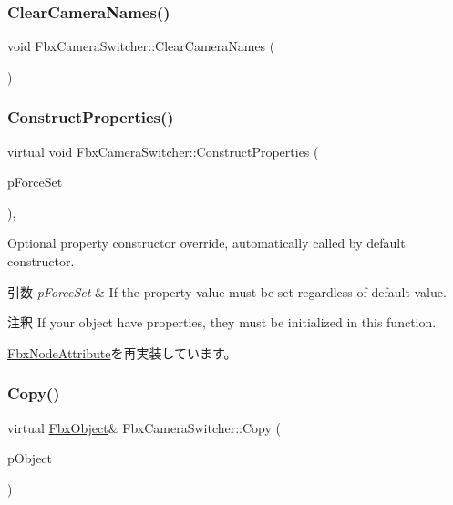 \subsubsection{\texorpdfstring{Clear\+Camera\+Names()}{ClearCameraNames()}}
{\footnotesize\ttfamily void Fbx\+Camera\+Switcher\+::\+Clear\+Camera\+Names (\begin{DoxyParamCaption}{ }\end{DoxyParamCaption})}

\mbox{\label{class_fbx_camera_switcher_a38011053f3a61df4e93989d7c970fa16}} 
\subsubsection{\texorpdfstring{Construct\+Properties()}{ConstructProperties()}}
{\footnotesize\ttfamily virtual void Fbx\+Camera\+Switcher\+::\+Construct\+Properties (\begin{DoxyParamCaption}\item[{bool}]{p\+Force\+Set }\end{DoxyParamCaption})\hspace{0.3cm}{\ttfamily [protected]}, {\ttfamily [virtual]}}

Optional property constructor override, automatically called by default constructor. 
\begin{DoxyParams}{引数}
{\em p\+Force\+Set} & If the property value must be set regardless of default value. \\
\hline
\end{DoxyParams}
\begin{DoxyRemark}{注釈}
If your object have properties, they must be initialized in this function. 
\end{DoxyRemark}


\hyperlink{class_fbx_node_attribute_a042eb9949a9b9634dcc5f126e82fd04a}{Fbx\+Node\+Attribute}を再実装しています。

\mbox{\label{class_fbx_camera_switcher_a4f9ed75fe53a90e3bfae94415714fc99}} 
\subsubsection{\texorpdfstring{Copy()}{Copy()}}
{\footnotesize\ttfamily virtual \hyperlink{class_fbx_object}{Fbx\+Object}\& Fbx\+Camera\+Switcher\+::\+Copy (\begin{DoxyParamCaption}\item[{const \hyperlink{class_fbx_object}{Fbx\+Object} \&}]{p\+Object }\end{DoxyParamCaption})\hspace{0.3cm}{\ttfamily [virtual]}}

